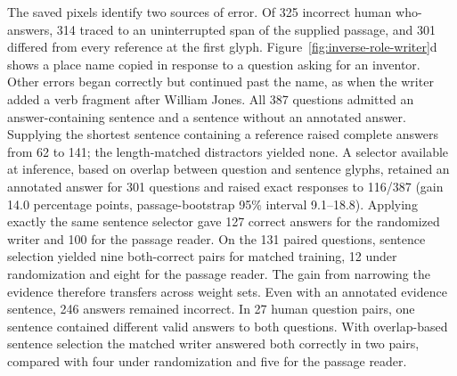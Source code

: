 The saved pixels identify two sources of error. Of 325 incorrect human who-answers, 314 traced to an uninterrupted span of the supplied passage, and 301 differed from every reference at the first glyph. Figure~\ref{fig:inverse-role-writer}d shows a place name copied in response to a question asking for an inventor. Other errors began correctly but continued past the name, as when the writer added a verb fragment after William Jones. All 387 questions admitted an answer-containing sentence and a sentence without an annotated answer. Supplying the shortest sentence containing a reference raised complete answers from 62 to 141; the length-matched distractors yielded none. A selector available at inference, based on overlap between question and sentence glyphs, retained an annotated answer for 301 questions and raised exact responses to 116/387 (gain 14.0 percentage points, passage-bootstrap 95\% interval 9.1--18.8). Applying exactly the same sentence selector gave 127 correct answers for the randomized writer and 100 for the passage reader. On the 131 paired questions, sentence selection yielded nine both-correct pairs for matched training, 12 under randomization and eight for the passage reader. The gain from narrowing the evidence therefore transfers across weight sets. Even with an annotated evidence sentence, 246 answers remained incorrect. In 27 human question pairs, one sentence contained different valid answers to both questions. With overlap-based sentence selection the matched writer answered both correctly in two pairs, compared with four under randomization and five for the passage reader.
